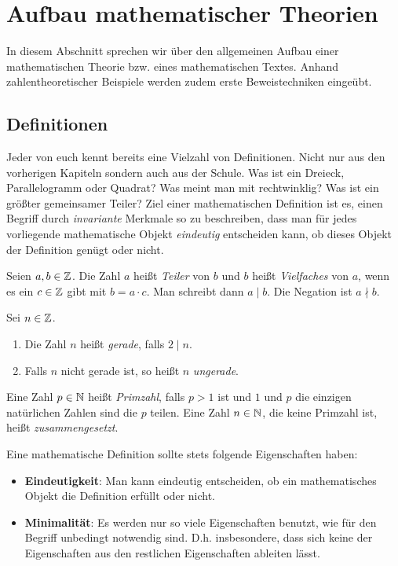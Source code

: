 \chapter{Aufbau mathematischer Theorien}

In diesem Abschnitt sprechen wir über den allgemeinen Aufbau einer mathematischen Theorie bzw. eines mathematischen Textes. 
Anhand zahlentheoretischer Beispiele werden zudem erste Beweistechniken eingeübt. 

\section{Definitionen}

Jeder von euch kennt bereits eine Vielzahl von Definitionen. Nicht nur aus den vorherigen Kapiteln sondern auch aus der Schule. 
Was ist ein Dreieck, Parallelogramm oder Quadrat? Was meint man mit rechtwinklig? Was ist ein größter gemeinsamer Teiler?
Ziel einer mathematischen Definition ist es, einen Begriff durch \textit{invariante} Merkmale so zu beschreiben, dass man für jedes 
vorliegende mathematische Objekt \textit{eindeutig} entscheiden kann, ob dieses Objekt der Definition genügt oder nicht. 

\begin{mydef}
    Seien $a,b \in \mathbb{Z}$. Die Zahl $a$ heißt \textit{Teiler} von $b$ und $b$ heißt \textit{Vielfaches} von $a$, wenn es ein $c \in \mathbb{Z}$ gibt mit 
    $b = a \cdot c$. Man schreibt dann $a \mid b$. Die Negation ist $a \nmid b$. 
\end{mydef}

\begin{mydef}
    Sei $n \in \mathbb{Z}$. 
    \begin{enumerate}
        \item 
        Die Zahl $n$ heißt \textit{gerade}, falls $2 \mid n$. 
        \item 
        Falls $n$ nicht gerade ist, so heißt $n$ \textit{ungerade}. 
    \end{enumerate}
\end{mydef}

\begin{mydef}
    Eine Zahl $p \in \mathbb{N}$ heißt \textit{Primzahl}, falls $p > 1$ ist und $1$ und $p$ die einzigen natürlichen Zahlen sind die $p$ teilen. Eine Zahl $n \in \mathbb{N}$, die keine Primzahl ist, heißt \textit{zusammengesetzt}. 
\end{mydef}

Eine mathematische Definition sollte stets folgende Eigenschaften haben: 
\begin{itemize}
    \item 
    \textbf{Eindeutigkeit}: Man kann eindeutig entscheiden, ob ein mathematisches Objekt die Definition erfüllt oder nicht. 
    \item 
    \textbf{Minimalität}: Es werden nur so viele Eigenschaften benutzt, wie für den Begriff unbedingt notwendig sind. 
    D.h. insbesondere, dass sich keine der Eigenschaften aus den restlichen Eigenschaften ableiten lässt. 
\end{itemize}

